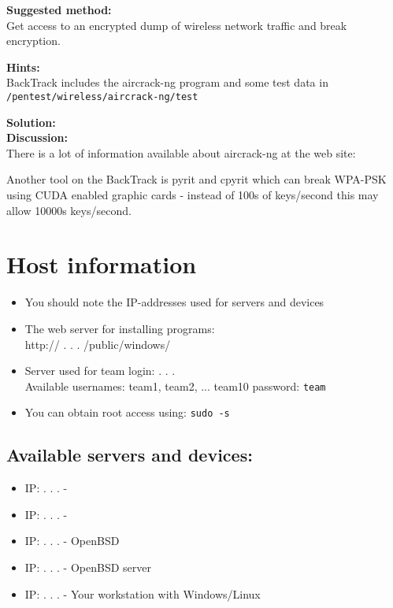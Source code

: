 \documentclass[a4paper,11pt,notitlepage]{report}
\begin{document}
{\bf Suggested method:}\\
Get access to an encrypted dump of wireless network traffic and break encryption.


{\bf Hints:}\\
BackTrack includes the aircrack-ng program and some test data in \\
\verb+/pentest/wireless/aircrack-ng/test+

{\bf Solution:}\\

{\bf Discussion:}\\
There is a lot of information available about aircrack-ng at the web site:\\

Another tool on the BackTrack is pyrit and cpyrit which can break WPA-PSK using CUDA enabled
graphic cards - instead of 100s of keys/second this may allow 10000s keys/second.


\appendix
\rhead{\fancyplain{}{\bf \leftmark}}

\normal

\chapter{\color{titlecolor}Host information}

\begin{itemize}
\item You should note the IP-addresses used for servers and devices
\item The web server for installing programs:\\
http:// \hskip 15mm .\hskip 15mm .\hskip 15mm .\hskip 15mm
/public/windows/
\item Server used for team login: \hskip 15mm .\hskip 15mm .\hskip 15mm .\hskip 15mm \\
Available usernames: team1, team2, ... team10
password: \verb+team+
\item You can obtain root access using: \verb+sudo -s+
\end{itemize}

\section*{\color{titlecolor}Available servers and devices:}
\begin{itemize}
\item IP: \hskip 15mm .\hskip 15mm .\hskip 15mm .\hskip 15mm -
\item IP: \hskip 15mm .\hskip 15mm .\hskip 15mm .\hskip 15mm -
\item IP: \hskip 15mm .\hskip 15mm .\hskip 15mm .\hskip 15mm -
  OpenBSD
\item IP: \hskip 15mm .\hskip 15mm .\hskip 15mm .\hskip 15mm -
  OpenBSD server
\item IP: \hskip 15mm .\hskip 15mm .\hskip 15mm .\hskip 15mm - Your workstation with Windows/Linux
\end{itemize}



%



\end{document}
